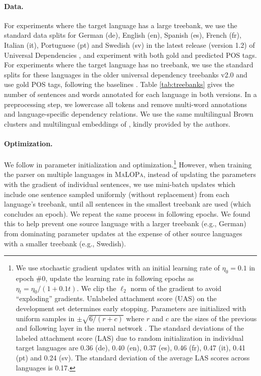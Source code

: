 \documentclass[11pt]{article}
\newcommand{\malopa}{\textsc{MaLOPa}}
\begin{document}
\paragraph{Data.} For experiments where the target language has a large treebank, we use the standard data splits for German (de), English (en), Spanish (es), French (fr), Italian (it), Portuguese (pt) and Swedish (sv) in the latest release (version 1.2) of Universal Dependencies \cite{universal:v1_2}, and experiment with both gold and predicted POS tags.
For experiments where the target language has no treebank, we use the standard splits for these languages in the older universal dependency treebanks v2.0 \cite{mcdonald:13} and use gold POS tags, following the baselines \cite{zhang:15,guo:16}.
Table \ref{tab:treebanks} gives the number of sentences and words annotated for each language in both versions.
In a preprocessing step, we lowercase all tokens and remove multi-word annotations and language-specific dependency relations.
We use the same multilingual Brown clusters and multilingual embeddings of , kindly provided by the authors.

\paragraph{Optimization.} We follow  in parameter initialization and optimization.\footnote{We use stochastic gradient updates with an initial learning rate of $\eta_0=0.1$ in epoch \#0, update the learning rate in following epochs as $\eta_t=\eta_0/(1+ 0.1 t)$. We clip the $\ell_2$ norm of the gradient to avoid ``exploding'' gradients. Unlabeled attachment score (UAS) on the development set determines early stopping. Parameters are initialized with uniform samples in $\pm \sqrt{6/(r+c)}$ where $r$ and $c$ are the sizes of the previous and following layer in the nueral network \cite{glorot:10}. The standard deviations of the labeled attachment score (LAS) due to random initialization in individual target languages are 0.36 (de), 0.40 (en), 0.37 (es), 0.46 (fr), 0.47 (it), 0.41 (pt) and 0.24 (sv). The standard deviation of the average LAS scores across languages is 0.17.}
However, when training the parser on multiple languages in \malopa, instead of updating the parameters with the gradient of individual sentences, we use mini-batch updates which include one sentence sampled uniformly (without replacement) from each language's treebank, until all sentences in the smallest treebank are used (which concludes an epoch). 
We repeat the same process in following epochs.
We found this to help prevent one source language with a larger treebank (e.g., German) from dominating parameter updates at the expense of other source languages with a smaller treebank (e.g., Swedish).
\end{document}
